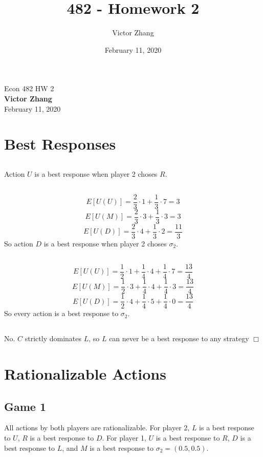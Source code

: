 \documentclass{article}
\title{482 - Homework 2}
\author{Victor Zhang }
\date{February 11, 2020}
\begin{document}
\begin{center}
{\huge Econ 482 \hspace{0.5cm} HW 2}\\
{\Large \textbf{Victor Zhang}}\\ %
{\Large February 11, 2020} %
\end{center}

\section{Best Responses}
\subsection{}
Action $U$ is a best response when player 2 choses $R$.
\subsection{}
$$E[U(U)] = \frac{2}{3}\cdot 1 + \frac{1}{3}\cdot 7 = 3$$
$$E[U(M)] = \frac{2}{3}\cdot 3 + \frac{1}{3}\cdot 3 = 3$$
$$E[U(D)] = \frac{2}{3}\cdot 4 + \frac{1}{3}\cdot 2 = \frac{11}{3}$$
So action $D$ is a best response when player 2 choses $\sigma_2$.
\subsection{}
$$E[U(U)] = \frac{1}{2}\cdot 1 + \frac{1}{4}\cdot 4 + \frac{1}{4}\cdot 7 = \frac{13}{4}$$
$$E[U(M)] = \frac{1}{2}\cdot 3 + \frac{1}{4}\cdot 4 + \frac{1}{4}\cdot 3 = \frac{13}{4}$$
$$E[U(D)] = \frac{1}{2}\cdot 4 + \frac{1}{4}\cdot 5 + \frac{1}{4}\cdot 0 = \frac{13}{4}$$
So every action is a best response to $\sigma_2$.
\subsection{}
No. $C$ strictly dominates $L$, so $L$ can never be a best response to any strategy $\Box$

\section{Rationalizable Actions}
\subsection{Game 1}
All actions by both players are rationalizable. For player 2, $L$ is a best response to $U$, $R$ is a best response to $D$. For player 1, $U$ is a best response to $R$, $D$ is a best response to $L$, and $M$ is a best response to $\sigma_2 = (0.5,0.5)$.
\end{document}

